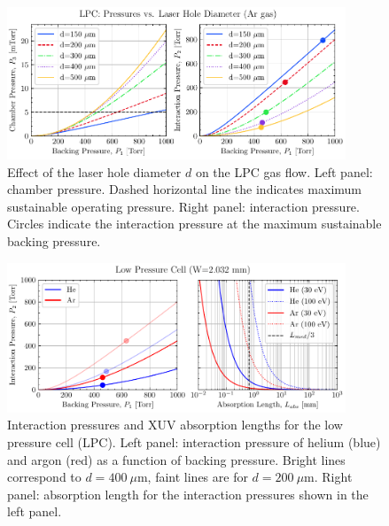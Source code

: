 \begin{figure}
	\centering
	\includegraphics[width=0.9\textwidth]{figures/chap3/LPC_pressure_vs_diameter.pdf}
	\caption{Effect of the laser hole diameter $d$ on the LPC gas flow. Left panel: chamber pressure. Dashed horizontal line the indicates maximum sustainable operating pressure. Right panel: interaction pressure. Circles indicate the interaction pressure at the maximum sustainable backing pressure.}
	\label{fig:LPC_pressure_vs_diameter}
\end{figure}

\begin{figure}
	\centering
	\includegraphics[width=0.9\textwidth]{figures/chap3/LPC_IntPress_AbsLen.pdf}
	\caption{Interaction pressures and XUV absorption lengths for the low pressure cell (LPC). Left panel: interaction pressure of helium (blue) and argon (red) as a function of backing pressure. Bright lines correspond to $d = 400 \ \mu$m, faint lines are for $d = 200 \ \mu$m. Right panel: absorption length for the interaction pressures shown in the left panel.}
	\label{fig:LPC_IntPress_AbsLen}
\end{figure}


